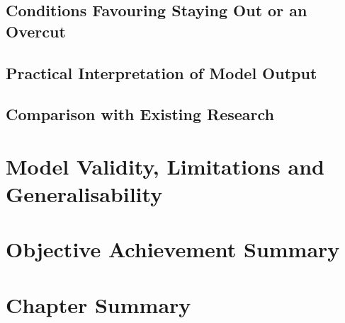 \subsection{Conditions Favouring Staying Out or an Overcut}

\subsection{Practical Interpretation of Model Output}

\subsection{Comparison with Existing Research}

\section{Model Validity, Limitations and Generalisability}
\label{sec:validity-limitations}


\section{Objective Achievement Summary}
\label{sec:objective-achievement-results}


\section{Chapter Summary}
\label{sec:results-summary}

